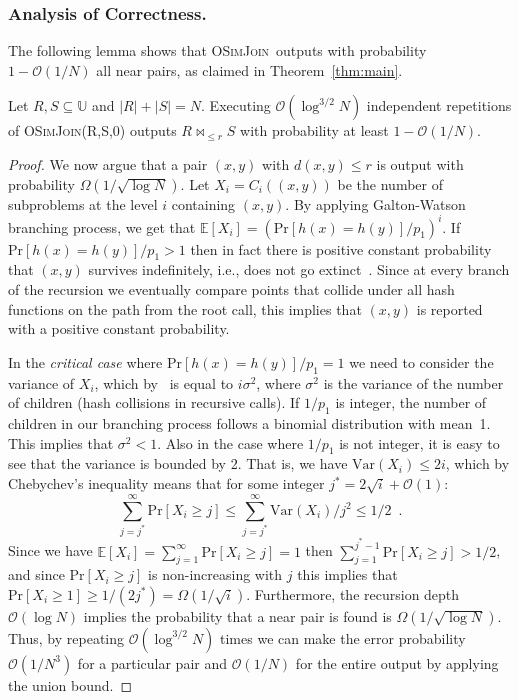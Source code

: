 \documentclass{llncs}
\newcommand{\Osymbol}{{\mathcal O}}
\newcommand{\BO}[1]{\Osymbol\left(#1\right)}
\newcommand{\BOM}[1]{\Omega\left(#1\right)}
\newcommand{\E}[1]{\mathbb{E}\left[#1\right]}
\newcommand{\V}[1]{\text{Var}\left(#1\right)}
\renewcommand{\Pr}[1]{\text{Pr}\left[#1\right]}
\newcommand{\SimJoin}{\textsc{OSimJoin}}
\begin{document}
\subsubsection{Analysis of Correctness.}\label{sec:correctness}
The following lemma shows that \SimJoin\ outputs with probability $1 - \BO{1/N}$
all  near pairs,  as claimed in Theorem~\ref{thm:main}.
\begin{lemma}\label{lem:prob}
Let $R,S \subseteq \mathbb{U}$ and $|R| + |S| = N$. Executing $\BO{\log^{3/2} N}$ independent 
repetitions of \SimJoin(R,S,0) outputs $R \bowtie_{\leq r}  S$ with probability at least $1 - \BO{1/N}$.
\end{lemma}
\begin{proof}
We now argue that a pair $(x,y)$ with $d(x,y)\leq r$ is output with probability $\Omega ( 1 / \sqrt{\log N})$.
Let $X_i = C_i((x,y))$ be the number of subproblems at the level $i$ containing $(x,y)$.
By applying Galton-Watson branching process, we get that $\E{X_i}=(\Pr{h(x)=h(y)}/p_1)^i$.
If $\Pr{h(x)=h(y)}/p_1 > 1$ then in fact there is positive constant probability that $(x,y)$ survives indefinitely, i.e., does not go extinct~\cite{harris2002theory}.
Since at every branch of the recursion we eventually compare points that collide under all hash functions on the path from the root call, this implies that $(x,y)$ is reported with a positive constant probability.

In the \emph{critical case} where $\Pr{h(x)=h(y)}/p_1 = 1$ we need to consider the variance of $X_i$, which by~\cite[Theorem 5.1]{harris2002theory} is equal to $i\sigma^2$, where $\sigma^2$ is the variance of the number of children (hash collisions in recursive calls).
If $1/p_1$ is integer, the number of children in our branching process follows a binomial distribution with mean~1.
This implies that $\sigma^2 < 1$.
Also in the case where $1/p_1$ is not integer, it is easy to see that the variance is bounded by 2. That is, we have $\V{X_i} \leq 2i$, which by Chebychev's inequality means that for some integer $j^* = 2\sqrt{i} + \BO{1}$:
$$\sum_{j=j^*}^\infty \Pr{X_i \geq j} \leq \sum_{j=j^*}^\infty \V{X_i}/j^2 \leq 1/2 \enspace . $$
Since we have $\E{X_i} = \sum_{j=1}^\infty \Pr{X_i \geq j} = 1$ then $\sum_{j=1}^{j^*-1} \Pr{X_i \geq j} > 1/2$, and since $\Pr{X_i \geq j}$ is non-increasing with $j$ this implies that $\Pr{X_i \geq 1} \geq 1/(2j^*) = \BOM{1/\sqrt{i}}$.
Furthermore, the recursion depth $\BO{\log N}$ implies the probability that a near pair is found is $\BOM{1/\sqrt{\log N}}$.
Thus, by repeating $\BO{\log^{3/2} N}$ times we can make the error probability $\BO{1/N^3}$ for a particular pair and $\BO{1/N}$ for the entire output by applying the union bound.
\end{proof}
\end{document}
